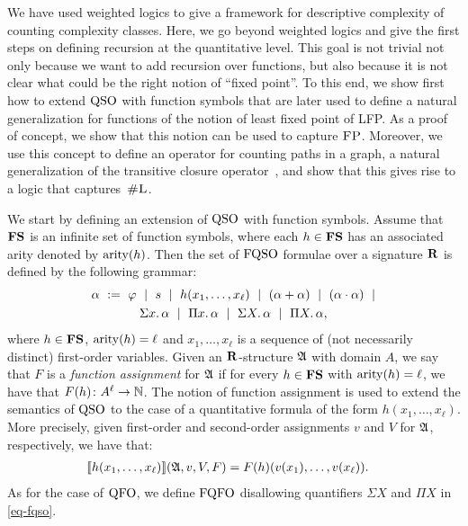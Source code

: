 
We have used weighted logics to give a framework for descriptive complexity of counting complexity classes. Here, we go beyond weighted logics and give the first steps on defining recursion at the quantitative level.
This goal is not trivial not only because we want to add recursion over functions, but also because 
it is not clear what could be the right notion of ``fixed point''. 
To this end, we show first how to extend ${\rm QSO}$ with function symbols that are later
used 
to define a natural generalization for functions of 
the notion of least fixed point of LFP.
 As a proof of concept, we show that this notion can be used to capture $\text{\sc FP}$.
Moreover, we use this concept
to define an operator for counting paths in a graph, a natural generalization of the transitive closure operator~\cite{immerman1999descriptive}, and show that this gives rise to a logic that captures~$\text{\sc \#L}$. 

We start by defining an extension of ${\rm QSO}$ with function symbols. Assume that $\mathbf{FS}$ is an infinite set of function symbols, where each $h \in \mathbf{FS}$ has an associated arity denoted by ${\rm arity}(h)$. Then the set of ${\rm FQSO}$ formulae over a signature $\mathbf{R}$ is defined by the following grammar:
\begin{multline}
\label{eq-fqso}
	\alpha \ :=  \ \varphi \ \mid \  s \  \mid \  h(x_1, \ldots, x_\ell) \  \mid \
	(\alpha + \alpha) \  \mid\  (\alpha \cdot \alpha) \  \mid \\
	\Sigma{x}.\, \alpha \  \mid \
	\Pi{x}.\, \alpha \  \mid \
	\Sigma{X}.\, \alpha \  \mid \
	\Pi{X}.\, \alpha,
\end{multline}
where $h \in \mathbf{FS}$, ${\rm arity}(h) = \ell$ and $x_1, \ldots, x_\ell$ is a sequence of (not necessarily distinct) first-order variables. Given an $\mathbf{R}$-structure $\mathfrak{A}$ with domain $A$, we say that $F$ is a \emph{function assignment} for $\mathfrak{A}$ if for every $h \in \mathbf{FS}$ with ${\rm arity}(h) = \ell$, we have that $F(h)\colon A^\ell \to \mathbb{N}$. The notion of function assignment is used to extend the semantics of ${\rm QSO}$ to the case of a quantitative formula of the form $h(x_1, \ldots, x_\ell)$. More precisely, given first-order and second-order assignments $v$ and $V$ for $\mathfrak{A}$, respectively, 
we have that:
\begin{align*}
{\llbracket{}{h(x_1, \ldots, x_\ell)}\rrbracket}(\mathfrak{A},v,V,F) &= F(h)(v(x_1),\ldots, v(x_\ell)).
\end{align*}
As for the case of ${\rm QFO}$, we define ${\rm FQFO}$ disallowing quantifiers $\Sigma X$ and $\Pi X$ in \eqref{eq-fqso}.

